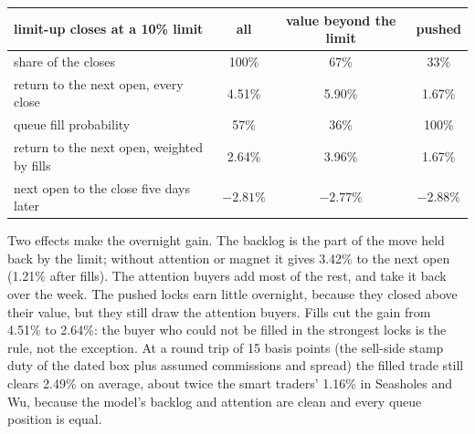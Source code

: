 \begin{center}
\small
\begin{tabular}{@{}lccc@{}}
\toprule
limit-up closes at a 10\% limit & all & value beyond the limit & pushed\\
\midrule
share of the closes & 100\% & 67\% & 33\%\\
return to the next open, every close & 4.51\% & 5.90\% & 1.67\%\\
queue fill probability & 57\% & 36\% & 100\%\\
return to the next open, weighted by fills & 2.64\% & 3.96\% & 1.67\%\\
next open to the close five days later & $-2.81\%$ & $-2.77\%$ & $-2.88\%$\\
\bottomrule
\end{tabular}
\end{center}

Two effects make the overnight gain. The backlog is the part of the move held back by the limit; without attention or magnet it gives 3.42\% to the next
open (1.21\% after fills). The attention buyers add most of the rest, and take it back over the week. The pushed locks earn little overnight, because they
closed above their value, but they still draw the attention buyers. Fills cut the gain from 4.51\% to 2.64\%: the buyer who could not be filled in the
strongest locks is the rule, not the exception. At a round trip of 15 basis points (the sell-side stamp duty of the dated box plus assumed commissions
and spread) the filled trade still clears 2.49\% on average, about twice the smart traders' 1.16\% in Seasholes and Wu, because the model's backlog and
attention are clean and every queue position is equal.

